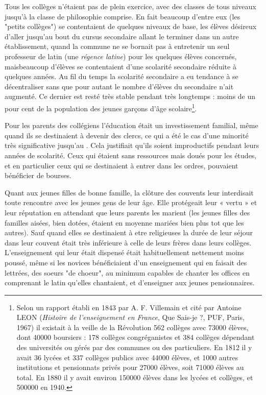 Tous les collèges n'étaient pas de plein exercice, avec des classes de tous niveaux jusqu'à la classe de philosophie comprise. En fait beaucoup d'entre eux (les "petits collèges") se contentaient de quelques niveaux de base, les élèves désireux d'aller jusqu'au bout du cursus secondaire allant le terminer dans un autre établissement, quand la commune ne se bornait pas à entretenir un seul professeur de latin (une \emph{régence latine}) pour les quelques élèves concernés, maisbeaucoup d'élèves se contentaient d'une scolarité secondaire réduite à quelques années. Au fil du temps la scolarité secondaire a eu tendance à se décentraliser sans que pour autant le nombre d'élèves du secondaire n'ait augmenté. Ce dernier est resté très stable pendant très longtemps : moins de un pour cent de la population des jeunes garçons d'âge scolaire\footnote{Selon un rapport établi en 1843 par A. F. Villemain  et cité par Antoine LEON (\emph{Histoire de l'enseignement en France}, Que Sais-je ?, PUF, Paris, 1967) il existait à la veille de la Révolution 562 collèges avec 73000 élèves, dont 40000 boursiers : 178 collèges congréganistes et 384 collèges dépendant des universités ou gérés par des communes ou des particuliers. En 1812 il y avait 36 lycées et 337 collèges publics avec 44000 élèves, et 1000 autres institutions et pensionnats privés pour 27000 élèves, soit 71000 élèves au total. En 1880 il y avait environ 150000 élèves dans les lycées et collèges, et 500000 en 1940.}. 
 
 Pour les parents des collégiens l'éducation était un investissement familial, même quand ils se destinaient à devenir des clercs, ce qui a été le cas d'une minorité très significative jusqu'au . Cela justifiait qu'ils soient improductifs pendant leurs années de scolarité. Ceux qui étaient sans ressources mais doués pour les études, et en particulier ceux qui se destinaient à entrer dans les ordres, pouvaient bénéficier de bourses.




Quant aux jeunes filles de bonne famille, la clôture des couvents leur interdisait toute rencontre avec les jeunes gens de leur âge. Elle protégeait leur « vertu » et leur réputation en attendant que leurs parents les marient (les jeunes filles des familles aisées, bien dotées, étaient en moyenne mariées bien plus tot que les autres). Sauf quand elles se destinaient à etre religieuses la durée de leur séjour dans leur couvent était très inférieure à celle de leurs frères dans leurs collèges. L'enseignement qui leur était dispensé était habituellement nettement moins poussé, même si les novices bénéficiaient d'un enseignement qui en faisait des lettrées, des soeurs "de choeur", au minimum capables de chanter les offices en comprenant le latin qu'elles chantaient, et d'enseigner aux jeunes pensionnaires.

